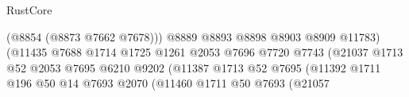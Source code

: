 \begin{lexlean}{RustCore}
\begin{coremodule}
                                                            (@8854 (@8873 @7662 @7678)))
                                                          @8889
                                                          @8893
                                                          @8898
                                                          @8903
                                                          @8909
                                                          @11783)
                                                        (@11435
                                                          @7688
                                                          @1714
                                                          @1725
                                                          @1261
                                                          @2053
                                                          @7696
                                                          @7720
                                                          @7743
                                                          (@21037
                                                            @1713
                                                            @52
                                                            @2053
                                                            @7695
                                                            @6210
                                                            @9202
                                                            (@11387
                                                              @1713
                                                              @52
                                                              @7695
                                                              (@11392
                                                                @1711
                                                                @196
                                                                @50
                                                                @14
                                                                @7693
                                                                @2070
                                                                (@11460
                                                                  @1711
                                                                  @50
                                                                  @7693
                                                                  (@21057

\end{coremodule}
\end{lexlean}
